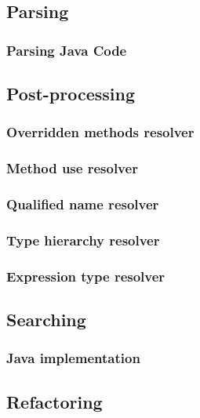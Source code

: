 \documentclass[12pt, letterpaper]{article}
\begin{document}
\subsection{Parsing}

\subsubsection{Parsing Java Code}

\subsection{Post-processing}

\subsubsection{Overridden methods resolver}

\subsubsection{Method use resolver}

\subsubsection{Qualified name resolver}

\subsubsection{Type hierarchy resolver}

\subsubsection{Expression type resolver}

\subsection{Searching}

\subsubsection{Java implementation}

\subsection{Refactoring}
\end{document}
